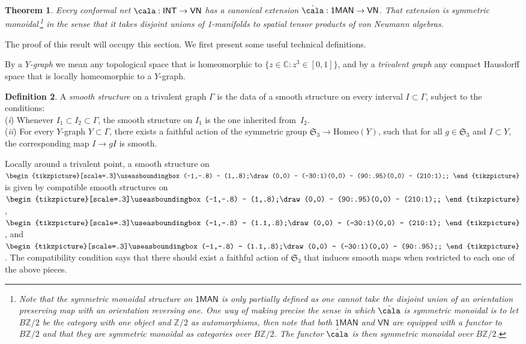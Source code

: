 \documentclass[a4paper,10pt,leqno]{amsart}
\newcommand{\IC}{\mathbb{C}}     \newcommand{\calc}{\mathcal{C}}
\newcommand{\IZ}{\mathbb{Z}}     \newcommand{\calz}{\mathcal{Z}}
\newcommand{\tikzmath}[2][]
     {\vcenter{\hbox{\begin{tikzpicture}[#1]#2
                     \end{tikzpicture}}}
     }
\theoremstyle{plain}
\newtheorem{theorem}{Theorem}[section]
\theoremstyle{definition}
\newtheorem{definition}[theorem]{Definition}
\theoremstyle{remark}
\newcommand{\INT}{{\mathsf{INT}}}
\newcommand{\VN}{{\mathsf{VN}}}
\begin{document}
\begin{theorem}\label{thm: extend A to hatA}
Every conformal net $\cala:\INT\to \VN$ has a canonical extension $\hat\cala:\mathsf{1MAN}\to \VN$.
That extension is symmetric monoidal\,\footnote{\label{footnote: BZ/2}Note that the symmetric monoidal structure on $\mathsf{1MAN}$ is only partially defined as one cannot take the disjoint union of an orientation preserving map with an orientation reversing one.
One way of making precise the sense in which $\hat \cala$ is symmetric monoidal is to 
let $B\IZ/2$ be the category with one object and $\IZ/2$ as automorphisms, then
note that both $\mathsf{1MAN}$ and $\VN$ are equipped with a functor to $B\IZ/2$ and that they are symmetric monoidal as categories over $B\IZ/2$.
The functor $\hat \cala$ is then symmetric monoidal over $B\IZ/2$.
} in the sense that it takes disjoint unions of 1-manifolds to spatial tensor products of von Neumann algebras.
\end{theorem}

\noindent The proof of this result will occupy this section.
We first present some useful technical definitions.

By a \emph{$Y$-graph} we mean any topological space that is homeomorphic to $\{z\in\IC:z^3\in [0,1]\}$,
and by a \emph{trivalent graph} any compact Hausdorff space that is locally homeomorphic to
a $Y$-graph.

\begin{definition}\label{def: smooth structure on trivalent graph}
A \emph{smooth structure} on a trivalent graph $\Gamma$ is the data of a smooth structure on every interval $I\subset \Gamma$, subject to the conditions:
\\({\it i}\hspace{.4mm}) Whenever $I_1\subset I_2\subset \Gamma$, the smooth structure on $I_1$ is the one inherited from~$I_2$.
\\({\it ii}\hspace{.4mm}) For every $Y$-graph $Y\subset \Gamma$, there exists a faithful action of the symmetric group $\mathfrak S_3\to\mathrm{Homeo}(Y)$,
such that for all $g\in \mathfrak S_3$ and $I\subset Y$, the corresponding map $I\to gI$ is smooth.
\end{definition}

Locally around a trivalent point, a smooth structure on
\(\tikzmath[scale=.3]{\useasboundingbox (-1,-.8) -- (1,.8);\draw (0,0) -- (-30:1)(0,0) -- (90:.95)(0,0) -- (210:1);;}\)\vspace{-.05cm}
is given by compatible smooth structures on
\(\tikzmath[scale=.3]{\useasboundingbox (-1,-.8) -- (1,.8);\draw (0,0) -- (90:.95)(0,0) -- (210:1);;}\),
\(\tikzmath[scale=.3]{\useasboundingbox (-1,-.8) -- (1.1,.8);\draw (0,0) -- (-30:1)(0,0) -- (210:1);}\), and
\(\tikzmath[scale=.3]{\useasboundingbox (-1,-.8) -- (1.1,.8);\draw (0,0) -- (-30:1)(0,0) -- (90:.95);;}\).
The compatibility condition says that there should exist a faithful action of $\mathfrak S_3$
that induces smooth maps when restricted to each one of the above pieces.\vspace{-.15cm}
\end{document}
